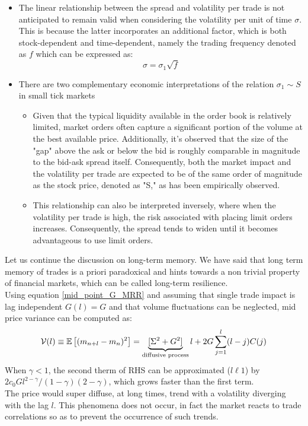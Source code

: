 \begin{itemize}
	\item 
	The linear relationship between the spread and volatility per trade is not anticipated to remain valid when considering the volatility per unit of time $\sigma$. This is because the latter incorporates an additional factor, which is both stock-dependent and time-dependent, namely the trading frequency denoted as $f$ which can be expressed as: 
	\[
	\sigma = \sigma_1 \sqrt{f}
	\]
	\item There are two complementary economic interpretations of the relation $\sigma_1 \sim S$ in small tick markets
	\begin{itemize}
		\item Given that the typical liquidity available in the order book is relatively limited, market orders often capture a significant portion of the volume at the best available price. Additionally, it's observed that the size of the "gap" above the ask or below the bid is roughly comparable in magnitude to the bid-ask spread itself. Consequently, both the market impact and the volatility per trade are expected to be of the same order of magnitude as the stock price, denoted as "S," as has been empirically observed.
		\item This relationship can also be interpreted inversely, where when the volatility per trade is high, the risk associated with placing limit orders increases. Consequently, the spread tends to widen until it becomes advantageous to use limit orders.
	\end{itemize}
\end{itemize}
Let us continue the discussion on long-term memory. We have said that long term memory of trades is a priori paradoxical and hints towards a non trivial property of financial markets, which can be called long-term resilience.\\
Using equation \ref{mid_point_G_MRR} and assuming that single trade impact is lag independent $G(l) =G$ and that volume fluctuations can be neglected, mid price variance can be computed as:
\[
\mathcal{V}(l)\equiv \mathbb{E}\left[(m_{n+l} - m_n)^2\right] = \underbrace{[ \Sigma^2 + G^2]}_{\text{diffusive process}}l + 2G \sum_{j =1}^{l} (l-j) C(j)
\]
When $\gamma <1$, the second therm of RHS can be approximated ($l \ell 1$) by $2c_0Gl^{2-\gamma}/(1-\gamma)(2-\gamma)$, which grows faster than the first term.\\
The price would super diffuse, at long times, trend with a volatility diverging with the lag $l$. This phenomena does not occur, in fact the market reacts to trade correlations so as to prevent the occurrence of such trends.
